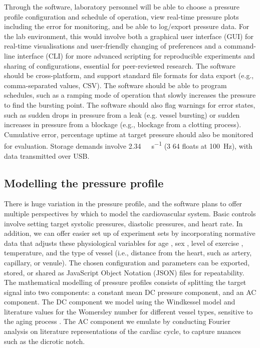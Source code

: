 \documentclass[10pt, a4paper]{article}
\begin{document}
Through the software, laboratory personnel will be able to choose a pressure profile configuration and schedule of operation, view real-time pressure plots including the error for monitoring, and be able to log/export pressure data. For the lab environment, this would involve both a graphical user interface (GUI) for real-time visualisations and user-friendly changing of preferences and a command-line interface (CLI) for more advanced scripting for reproducible experiments and sharing of configurations, essential for peer-reviewed research. The software should be cross-platform, and support standard file formats for data export (e.g., comma-separated values, CSV). The software should be able to program schedules, such as a ramping mode of operation that slowly increases the pressure to find the bursting point. The software should also flag warnings for error states, such as sudden drops in pressure from a leak (e.g. vessel bursting) or sudden increases in pressure from a blockage (e.g., blockage from a clotting process). Cumulative error, percentage uptime at target pressure should also be monitored for evaluation. Storage demands involve \SI{2.34}{\kilo\byte\per\second} (3 \SI{64}{\bit} floats at \SI{100}{Hz}), with data transmitted over USB.

\subsection{Modelling the pressure profile}

There is huge variation in the pressure profile, and the software plans to offer multiple perspectives by which to model the cardiovascular system. Basic controls involve setting target systolic pressures, diastolic pressures, and heart rate. In addition, we can offer easier set up of experiment sets by incorporating normative data that adjusts these physiological variables for age \supercite{linIdentificationNormalBlood2016}, sex \supercite{joynerSexDifferencesBlood2016}, level of exercise \supercite{sharmanExerciseBloodPressure2015}, temperature, and the type of vessel (i.e., distance from the heart, such as artery, capillary, or venule). The chosen configuration and parameters can be exported, stored, or shared as JavaScript Object Notation (JSON) files for repeatability. The mathematical modelling of pressure profiles consists of splitting the target signal into two components: a constant mean DC pressure component, and an AC component. The DC component we model using the Windkessel model \supercite{westerhofArterialWindkessel2009} and literature values for the Womersley number for different vessel types, sensitive to the aging process \supercite{loudonUseDimensionlessWomersley1998}. The AC component we emulate by conducting Fourier analysis on literature representations of the cardiac cycle, to capture nuances such as the dicrotic notch.
\end{document}
